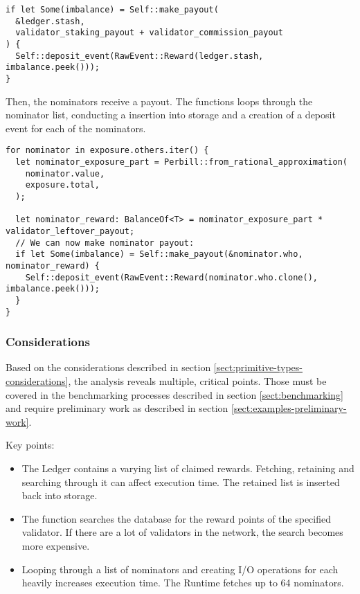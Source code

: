 \documentclass[11pt,a4paper]{article}
\begin{document}
\begin{verbatim}
if let Some(imbalance) = Self::make_payout(
  &ledger.stash,
  validator_staking_payout + validator_commission_payout
) {
  Self::deposit_event(RawEvent::Reward(ledger.stash, imbalance.peek()));
}
\end{verbatim}

Then, the nominators receive a payout. The functions loops through the nominator
list, conducting a insertion into storage and a creation of a deposit event for
each of the nominators.

\begin{verbatim}
for nominator in exposure.others.iter() {
  let nominator_exposure_part = Perbill::from_rational_approximation(
    nominator.value,
    exposure.total,
  );

  let nominator_reward: BalanceOf<T> = nominator_exposure_part * validator_leftover_payout;
  // We can now make nominator payout:
  if let Some(imbalance) = Self::make_payout(&nominator.who, nominator_reward) {
    Self::deposit_event(RawEvent::Reward(nominator.who.clone(), imbalance.peek()));
  }
}
\end{verbatim}

\subsubsection*{Considerations}

Based on the considerations described in section
\ref{sect:primitive-types-considerations}, the analysis reveals multiple,
critical points. Those must be covered in the benchmarking processes described
in section \ref{sect:benchmarking} and require preliminary work as described in
section \ref{sect:examples-preliminary-work}.
\newline

Key points:

\begin{itemize}
  \item The Ledger contains a varying list of claimed rewards. Fetching,
  retaining and searching through it can affect execution time. The retained
  list is inserted back into storage.
  \item The function searches the database for the reward points of the
  specified validator. If there are a lot of validators in the network, the
  search becomes more expensive.
  \item Looping through a list of nominators and creating I/O operations for each
  heavily increases execution time. The Runtime fetches up to 64 nominators.
\end{itemize}
\end{document}

